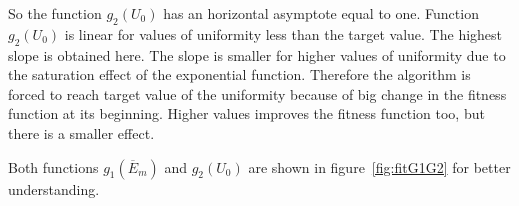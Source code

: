 So the function $g_2\left(U_{0}\right)$ has an horizontal asymptote equal to one. Function $g_2\left(U_{0}\right)$ is linear for values of uniformity less than the target value. The highest slope is obtained here. The slope is  smaller for higher values of uniformity due to the saturation effect of the exponential function. Therefore the algorithm is forced to reach target value of the uniformity because of big change in the fitness function at its beginning. Higher values improves the fitness function too, but there is a smaller effect.

Both functions $g_1\left(\overline{E}_{m}\right)$ and $g_2\left(U_{0}\right)$ are shown in figure~\ref{fig:fitG1G2} for better understanding.